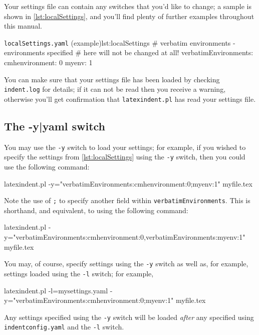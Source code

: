 	Your settings file can contain any switches that you'd like to change; a sample is shown
	in \cref{lst:localSettings}, and you'll find plenty of further examples throughout this
	manual.

	\begin{yaml}{\texttt{localSettings.yaml} (example)}{lst:localSettings}
#  verbatim environments - environments specified
#  here will not be changed at all!
verbatimEnvironments:
    cmhenvironment: 0
    myenv: 1
\end{yaml}

	You can make sure that your settings file has been loaded by checking \texttt{indent.log}
	for details; if it can not be read then you receive a warning, otherwise you'll get
	confirmation that \texttt{latexindent.pl} has read your settings file.

\subsection{The -y|yaml switch}\label{sec:yamlswitch}
	You%
	may use the \texttt{-y} switch to load your settings;  for example, if you wished to
	specify the settings from \cref{lst:localSettings} using the \texttt{-y} switch, then you
	could use the following command:
	\begin{commandshell}
latexindent.pl -y="verbatimEnvironments:cmhenvironment:0;myenv:1" myfile.tex
\end{commandshell}
	Note the use of \texttt{;} to specify another field within \texttt{verbatimEnvironments}.
	This is shorthand, and equivalent, to using the following command:
	\begin{commandshell}
latexindent.pl -y="verbatimEnvironments:cmhenvironment:0,verbatimEnvironments:myenv:1" myfile.tex
\end{commandshell}
	You may, of course, specify settings using the \texttt{-y} switch as well as, for
	example, settings loaded using the \texttt{-l} switch; for example,
	\begin{commandshell}
latexindent.pl -l=mysettings.yaml -y="verbatimEnvironments:cmhenvironment:0;myenv:1" myfile.tex
\end{commandshell}
	Any settings specified using the \texttt{-y} switch will be loaded \emph{after} any
	specified using \texttt{indentconfig.yaml} and the \texttt{-l} switch.

